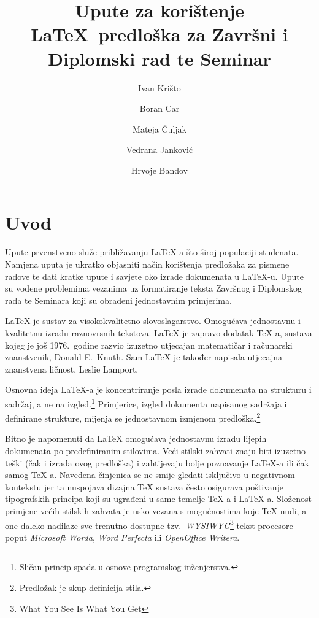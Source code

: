 \documentclass[zavrsni, lmodern, utf8]{fer}
\begin{document}
\title{Upute za korištenje \LaTeX\ predloška za Završni i Diplomski rad te Seminar}
\author{Ivan Krišto \and Boran Car \and Mateja Čuljak \and Vedrana Janković \and Hrvoje Bandov}

\maketitle

\zahvala{}

\tableofcontents

\chapter{Uvod}

Upute prvenstveno služe približavanju \LaTeX-a što široj populaciji studenata.
Namjena uputa je ukratko objasniti način korištenja predložaka za pismene radove
te dati kratke upute i savjete oko izrade dokumenata u \LaTeX-u. Upute su vođene
problemima vezanima uz formatiranje teksta Završnog i Diplomskog rada te Seminara
koji su obrađeni jednostavnim primjerima.

\LaTeX{} je sustav za visokokvalitetno slovoslagarstvo. Omogućava jednostavnu i
kvalitetnu izradu raznovrsnih tekstova. \LaTeX{} je zapravo dodatak \TeX-a, sustava
kojeg je još 1976.\ godine razvio izuzetno utjecajan matematičar i računarski
znanstvenik, Donald E.~Knuth. Sam \LaTeX{} je također napisala utjecajna
znanstvena ličnost, Leslie Lamport.

Osnovna ideja \LaTeX-a je koncentriranje posla izrade dokumenata na strukturu i
sadržaj, a ne na izgled.\footnote{Sličan princip spada u osnove programskog inženjerstva.}
Primjerice, izgled dokumenta napisanog sadržaja i definirane strukture, 
mijenja se jednostavnom izmjenom predloška.\footnote{Predložak je skup
definicija stila.}

Bitno je napomenuti da \LaTeX{} omogućava jednostavnu izradu lijepih dokumenata
po predefiniranim stilovima. Veći stilski zahvati znaju biti izuzetno teški (čak i
izrada ovog predloška) i zahtijevaju bolje poznavanje \LaTeX-a ili čak samog
\TeX-a. Navedena činjenica se ne smije gledati isključivo u negativnom kontekstu jer
ta nuspojava dizajna \TeX{} sustava često osigurava poštivanje tipografskih principa
koji su ugrađeni u same temelje \TeX-a i \LaTeX-a. Složenost primjene većih stilskih
zahvata je usko vezana s mogućnostima koje \TeX{} nudi, a one daleko nadilaze sve
trenutno dostupne tzv.\ \emph{WYSIWYG}\footnote{What You See Is What You Get} tekst
procesore poput \emph{Microsoft Worda}, \emph{Word Perfecta} ili \emph{OpenOffice Writera}.
\end{document}
